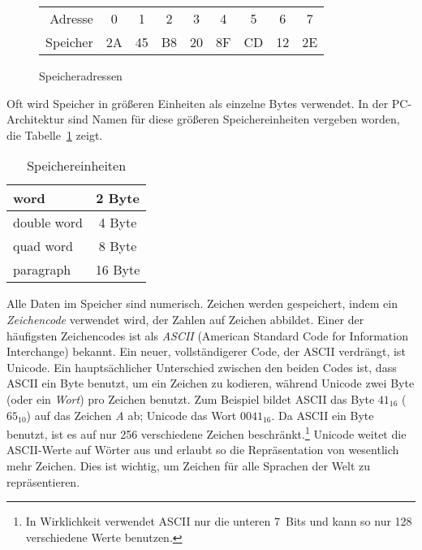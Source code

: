 \begin{figure}[ht]
\begin{center}
\begin{tabular}{rcccccccc}
 Adresse & 0 & 1 & 2 & 3 & 4 & 5 & 6 & 7 \\
\cline{2-9} Speicher
       & \multicolumn{1}{|c}{2A} & \multicolumn{1}{|c}{45}
       & \multicolumn{1}{|c}{B8} & \multicolumn{1}{|c}{20}
       & \multicolumn{1}{|c}{8F} & \multicolumn{1}{|c}{CD}
       & \multicolumn{1}{|c}{12} & \multicolumn{1}{|c|}{2E} \\
\cline{2-9}
\end{tabular}
\caption{ Speicheradressen \label{fig:memory} }
\end{center}
\end{figure}

Oft wird Speicher in gr\"{o}{\ss}eren Einheiten als einzelne Bytes
verwendet. In der PC-Architektur sind Namen f\"{u}r diese gr\"{o}{\ss}eren
Speichereinheiten vergeben worden, die Tabelle~\ref{tab:mem_units}
zeigt.

\begin{table}[ht]
\begin{center}
\begin{tabular}{|l|c|}
 \hline
 word & 2 Byte \\
 \hline
 double word & 4 Byte \\
 \hline
 quad word & 8 Byte \\
 \hline
 paragraph & 16 Byte \\
 \hline
\end{tabular}
\caption{ Speichereinheiten \label{tab:mem_units} }
\end{center}
\end{table}

Alle Daten im Speicher sind numerisch. Zeichen werden gespeichert,
indem ein \emph{Zeichencode} verwendet wird, der Zahlen auf Zeichen
abbildet. Einer der h\"{a}ufigsten Zeichencodes ist als \emph{ASCII}
(American Standard Code for In\-for\-ma\-tion Interchange)
 bekannt. Ein neuer, vollst\"{a}ndigerer Code, der ASCII
verdr\"{a}ngt, ist Unicode.  Ein haupts\"{a}chlicher
Unterschied zwischen den beiden Codes ist, dass ASCII ein Byte
benutzt, um ein Zeichen zu kodieren, w\"{a}hrend Unicode zwei Byte (oder
ein \emph{Wort}) pro Zeichen benutzt. Zum Beispiel bildet ASCII das
Byte $41_{16}$ ($65_{10}$) auf das Zeichen \emph{A} ab; Unicode das
Wort $0041_{16}$. Da ASCII ein Byte benutzt, ist es auf nur 256
verschiedene Zeichen beschr\"{a}nkt.\footnote{In Wirklichkeit verwendet
ASCII nur die unteren 7~Bits und kann so nur 128 verschiedene Werte
benutzen.}  Unicode  weitet die ASCII-Werte auf W\"{o}rter aus und
erlaubt so die Repr\"{a}sentation von wesentlich mehr Zeichen. Dies ist
wichtig, um Zeichen f\"{u}r alle Sprachen der Welt zu repr\"{a}sentieren.

